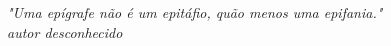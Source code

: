 \renewcommand{\epigraphname}{EPÍGRAFE}

\begin{epigrafe}[EPÍGRAFE]

\textit{"Uma epígrafe não é um epitáfio, quão menos uma epifania."
\\ autor desconhecido}

\end{epigrafe}

